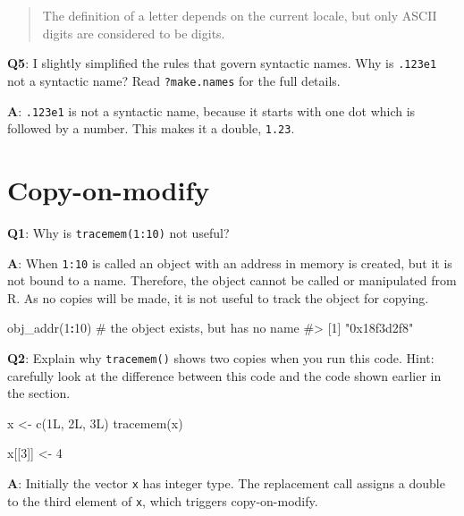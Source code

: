 \documentclass[
]{krantz}
\makeatletter
\newenvironment{Shaded}{\begin{snugshade}}{\end{snugshade}}
\newcommand{\CommentTok}[1]{\textcolor[rgb]{0.56,0.35,0.01}{\textit{#1}}}
\newcommand{\DecValTok}[1]{\textcolor[rgb]{0.00,0.00,0.81}{#1}}
\newcommand{\KeywordTok}[1]{\textcolor[rgb]{0.13,0.29,0.53}{\textbf{#1}}}
\newcommand{\NormalTok}[1]{#1}
\newcommand{\OperatorTok}[1]{\textcolor[rgb]{0.81,0.36,0.00}{\textbf{#1}}}
\newcommand{\StringTok}[1]{\textcolor[rgb]{0.31,0.60,0.02}{#1}}
\newenvironment{kframe}{%
\medskip{}
\setlength{\fboxsep}{.8em}
 \def\at@end@of@kframe{}%
 \ifinner\ifhmode%
  \def\at@end@of@kframe{\end{minipage}}%
  \begin{minipage}{\columnwidth}%
 \fi\fi%
 \def\FrameCommand##1{\hskip\@totalleftmargin \hskip-\fboxsep
 \colorbox{shadecolor}{##1}\hskip-\fboxsep
     \hskip-\linewidth \hskip-\@totalleftmargin \hskip\columnwidth}%
 \MakeFramed {\advance\hsize-\width
   \@totalleftmargin\z@ \linewidth\hsize
   \@setminipage}}%
 {\par\unskip\endMakeFramed%
 \at@end@of@kframe}
\renewenvironment{Shaded}{\begin{kframe}}{\end{kframe}}
\renewcommand{\KeywordTok} [1]{\textcolor[rgb]{0.00,0.44,0.13}{{#1}}}
\renewcommand{\DecValTok}  [1]{\textcolor[rgb]{0.25,0.63,0.44}{{#1}}}
\renewcommand{\StringTok}  [1]{\textcolor[rgb]{0.25,0.44,0.63}{{#1}}}
\renewcommand{\CommentTok} [1]{\textcolor[rgb]{0.38,0.63,0.69}{{#1}}}
\renewcommand{\NormalTok}  [1]{{#1}}
\makeatother
\begin{document}
\begin{quote}
The definition of a letter depends on the current locale, but only ASCII digits are considered to be digits.
\end{quote}

\textbf{{Q5}}: I slightly simplified the rules that govern syntactic names. Why is \texttt{.123e1} not a syntactic name? Read \texttt{?make.names} for the full details.

\textbf{{A}}: \texttt{.123e1} is not a syntactic name, because it starts with one dot which is followed by a number. This makes it a double, \texttt{1.23}.

\hypertarget{copy-on-modify}{%
\section{Copy-on-modify}\label{copy-on-modify}}

\textbf{{Q1}}: Why is \texttt{tracemem(1:10)} not useful?

\textbf{{A}}: When \texttt{1:10} is called an object with an address in memory is created, but it is not bound to a name. Therefore, the object cannot be called or manipulated from R. As no copies will be made, it is not useful to track the object for copying.

\begin{Shaded}
\begin{Highlighting}[]
\KeywordTok{obj_addr}\NormalTok{(}\DecValTok{1}\OperatorTok{:}\DecValTok{10}\NormalTok{)  }\CommentTok{# the object exists, but has no name}
\CommentTok{#> [1] "0x18f3d2f8"}
\end{Highlighting}
\end{Shaded}

\textbf{{Q2}}: Explain why \texttt{tracemem()} shows two copies when you run this code. Hint: carefully look at the difference between this code and the code shown earlier in the section.

\begin{Shaded}
\begin{Highlighting}[]
\NormalTok{x <-}\StringTok{ }\KeywordTok{c}\NormalTok{(1L, 2L, 3L)}
\KeywordTok{tracemem}\NormalTok{(x)}

\NormalTok{x[[}\DecValTok{3}\NormalTok{]] <-}\StringTok{ }\DecValTok{4}
\end{Highlighting}
\end{Shaded}

\textbf{{A}}: Initially the vector \texttt{x} has integer type. The replacement call assigns a double to the third element of \texttt{x}, which triggers copy-on-modify.
\end{document}
